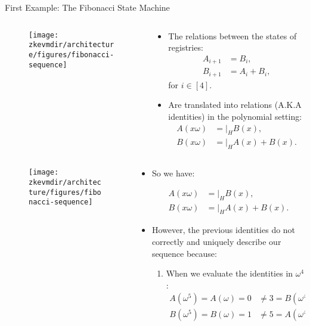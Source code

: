\begin{frame}[allowframebreaks]{First Example: The Fibonacci State Machine}
\begin{columns}
\begin{column}{0.3\textwidth}
\begin{figure}
	\texttt{[image: \\zkevmdir/architecture/figures/fibonacci-sequence]}
\end{figure}
\end{column}
\begin{column}{0.7\textwidth}
\begin{itemize}
\item The relations between the states of registries:
\begin{align*}
A_{i+1} &= B_i, \\
B_{i+1} &= A_i + B_i,
\end{align*}
for $i \in [4]$.
\item Are translated into relations (A.K.A identities) in the polynomial setting:
\begin{align*}
A(x\omega) &= \bigg\lvert_H  B(x), \\
B(x\omega) &= \bigg\lvert_H  A(x) + B(x).
\end{align*}
\end{itemize}
\end{column}
\end{columns}


\begin{columns}
\begin{column}{0.3\textwidth}
\begin{figure}
	\texttt{[image: \\zkevmdir/architecture/figures/fibonacci-sequence]}
\end{figure}
\end{column}
\begin{column}{0.7\textwidth}

\begin{itemize}
\item So we have:

\vspace{-0.8cm}
\begin{align*}
A(x\omega) &= \bigg\lvert_H  B(x), \\
B(x\omega) &= \bigg\lvert_H  A(x) + B(x).
\end{align*}
\item However, the previous identities do not correctly and uniquely describe our sequence because:
\begin{enumerate}
\item When we evaluate the identities in $\omega^4$:
\begin{align*}
A(\omega^5) = A(\omega) = 0 &\neq  3 = B(\omega^4), \\
B(\omega^5) = B(\omega) = 1 &\neq  5 = A(\omega^4) + B(\omega^4).
\end{align*}


\end{enumerate}
\end{itemize}
\end{column}
\end{columns}
\end{frame}
